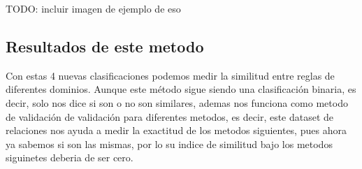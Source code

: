 TODO: incluir imagen de ejemplo de eso 

\subsection{Resultados de este metodo}

Con estas 4 nuevas clasificaciones podemos medir la similitud entre reglas de diferentes dominios. Aunque este método sigue siendo una clasificación binaria, es decir, solo nos dice si son o no son similares, ademas nos funciona como metodo de validación de validación para diferentes metodos, es decir, este dataset de relaciones nos ayuda a medir la exactitud de los metodos siguientes, pues ahora ya sabemos si son las mismas, por lo su indice de similitud bajo los metodos siguinetes deberia de ser cero.
